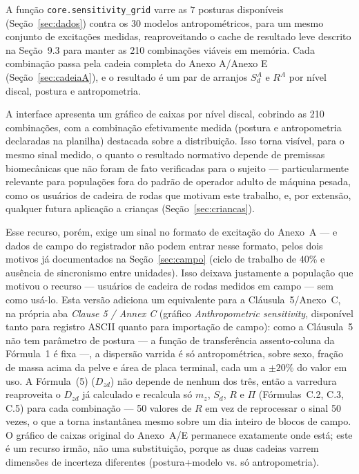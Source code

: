 \documentclass[11pt,a4paper]{article}
\newcommand{\code}[1]{\texttt{\small #1}}
\begin{document}
A função \code{core.sensitivity\_grid} varre as $7$ posturas disponíveis
(Seção~\ref{sec:dados}) contra os $30$ modelos antropométricos, para um mesmo
conjunto de excitações medidas, reaproveitando o cache de resultado leve
descrito na Seção~9.3 para manter as 210 combinações viáveis em memória. Cada
combinação passa pela cadeia completa do Anexo A/Anexo E (Seção~\ref{sec:cadeiaA}),
e o resultado é um par de arranjos $S_d^A$ e $R^A$ por nível discal, postura e
antropometria.

A interface apresenta um gráfico de caixas por nível discal, cobrindo as 210
combinações, com a combinação efetivamente medida (postura e antropometria
declaradas na planilha) destacada sobre a distribuição. Isso torna visível, para
o mesmo sinal medido, o quanto o resultado normativo depende de premissas
biomecânicas que não foram de fato verificadas para o sujeito --- particularmente
relevante para populações fora do padrão de operador adulto de máquina pesada,
como os usuários de cadeira de rodas que motivam este trabalho, e, por extensão,
qualquer futura aplicação a crianças (Seção~\ref{sec:criancas}).

Esse recurso, porém, exige um sinal no formato de excitação do Anexo~A --- e
dados de campo do registrador não podem entrar nesse formato, pelos dois
motivos já documentados na Seção~\ref{sec:campo} (ciclo de trabalho de 40\% e
ausência de sincronismo entre unidades). Isso deixava justamente a população
que motivou o recurso --- usuários de cadeira de rodas medidos em campo --- sem
como usá-lo. Esta versão adiciona um equivalente para a Cláusula~5/Anexo~C, na
própria aba \emph{Clause 5 / Annex C} (gráfico \emph{Anthropometric
sensitivity}, disponível tanto para registro ASCII quanto para importação de
campo): como a Cláusula~5 não tem parâmetro de postura --- a função de
transferência assento-coluna da Fórmula~1 é fixa ---, a dispersão varrida é só
antropométrica, sobre sexo, fração de massa acima da pelve e área de placa
terminal, cada um a $\pm 20\%$ do valor em uso. A Fórmula~(5) ($D_{zd}$) não
depende de nenhum dos três, então a varredura reaproveita o $D_{zd}$ já
calculado e recalcula só $m_z$, $S_d$, $R$ e $\Pi$ (Fórmulas~C.2, C.3, C.5)
para cada combinação --- 50 valores de $R$ em vez de reprocessar o sinal 50
vezes, o que a torna instantânea mesmo sobre um dia inteiro de blocos de
campo. O gráfico de caixas original do Anexo~A/E permanece exatamente onde
está; este é um recurso irmão, não uma substituição, porque as duas cadeias
varrem dimensões de incerteza diferentes (postura+modelo vs. só antropometria).
\end{document}
